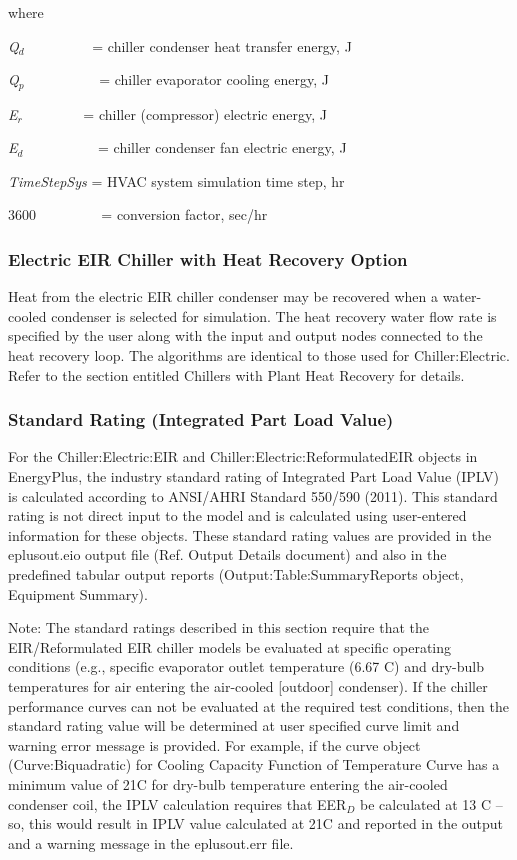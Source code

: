 where

\emph{Q\(_{d}\)}~~~~~~~~~ = chiller condenser heat transfer energy, J

\emph{Q\(_{p}\)}~~~~~~~~~~ = chiller evaporator cooling energy, J

\emph{E\(_{r}\)}~~~~~~~~ = chiller (compressor) electric energy, J

\emph{E\(_{d}\)}~~~~~~~~~~ = chiller condenser fan electric energy, J

\emph{TimeStepSys} = HVAC system simulation time step, hr

\(3600\) ~~~~~~~~ = conversion factor, sec/hr

\subsubsection{Electric EIR Chiller with Heat Recovery Option}\label{electric-eir-chiller-with-heat-recovery-option}

Heat from the electric EIR chiller condenser may be recovered when a water-cooled condenser is selected for simulation. The heat recovery water flow rate is specified by the user along with the input and output nodes connected to the heat recovery loop. The algorithms are identical to those used for Chiller:Electric. Refer to the section entitled Chillers with Plant Heat Recovery for details.

\subsubsection{Standard Rating (Integrated Part Load Value)}\label{standard-rating-integrated-part-load-value}

For the Chiller:Electric:EIR and Chiller:Electric:ReformulatedEIR objects in EnergyPlus, the industry standard rating of Integrated Part Load Value (IPLV) is calculated according to ANSI/AHRI Standard 550/590 (2011). This standard rating is not direct input to the model and is calculated using user-entered information for these objects. These standard rating values are provided in the eplusout.eio output file (Ref. Output Details document) and also in the predefined tabular output reports (Output:Table:SummaryReports object, Equipment Summary).

Note: The standard ratings described in this section require that the EIR/Reformulated EIR chiller models be evaluated at specific operating conditions (e.g., specific evaporator outlet temperature (6.67 C) and dry-bulb temperatures for air entering the air-cooled {[}outdoor{]} condenser). If the chiller~ performance curves can not be evaluated at the required test conditions, then the standard rating value will be determined at user specified curve limit and warning error message is provided. For example, if the curve object (Curve:Biquadratic) for Cooling Capacity Function of Temperature Curve has a minimum value of 21C for dry-bulb temperature entering the air-cooled condenser coil, the IPLV calculation requires that EER\(_{D}\) be calculated at 13 C -- so, this would result in IPLV value calculated at 21C and reported in the output and a warning message in the eplusout.err file.

